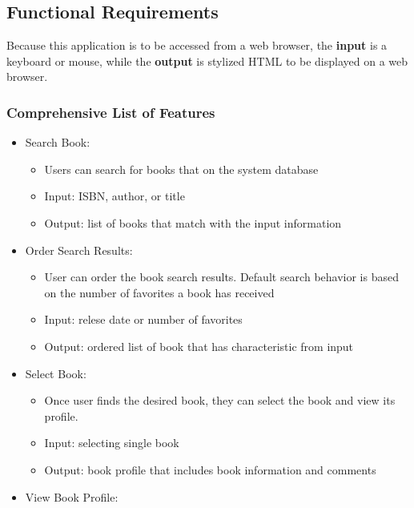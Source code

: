 \documentclass[letter, 12pt, titlepage]{article}
\begin{document}
\subsection{Functional Requirements}
Because this application is to be accessed from a web browser, the \textbf{input} is a keyboard or mouse, while the \textbf{output} is stylized HTML to be displayed on a web browser.

\subsubsection{Comprehensive List of Features}
\begin{itemize}

	\item	Search Book:
	      \begin{itemize}
		      \item  Users can search for books that on the system database
		      \item  Input: ISBN, author, or title
		      \item  Output: list of books that match with the input information
	      \end{itemize}
	\item	Order Search Results:
	      \begin{itemize}
		      \item  User can order the book search results. Default search behavior is based on the number of favorites a book has received
		      \item  Input: relese date or number of favorites
		      \item  Output: ordered list of book that has characteristic from input
	      \end{itemize}
	\item	Select Book:
	      \begin{itemize}
		      \item  Once user finds the desired book, they can select the book and view its profile.
		      \item  Input: selecting single book
		      \item  Output: book profile that includes book information and comments
	      \end{itemize}
	\item	View Book Profile:


\end{itemize}
\end{document}
